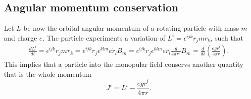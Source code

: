 \documentclass[main.tex]{subfiles}
\begin{document}
\subsection{Angular momentum conservation}
Let $L$ be now the orbital angular momentum of a rotating particle with mass $m$ and charge $e$. The particle experiments a variation of $L^i=\epsilon^{ijk}r_jm\dot r_k$, such that
\begin{align}
\frac{dL^i}{dt}=\epsilon^{ijk}r_jm\ddot r_k=\epsilon^{ijk}r_j\epsilon^{klm}e\dot r_lB_m=\epsilon^{ijk}r_j\epsilon^{klm}e\dot r_l\frac{g}{4\pi r^3}B_m=\frac{d}{dt}\left(\frac{egr^i}{4\pi r}\right).
\end{align}
This implies that a particle into the monopular field conservs another quantity that is the whole momentum
\begin{equation}
J^i=L^i-\frac{egr^i}{4\pi r}.
\end{equation}
\end{document}
